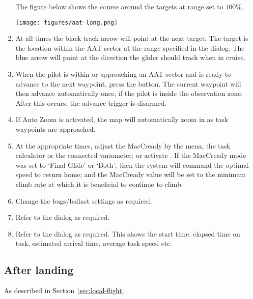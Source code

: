 \begin{enumerate}
The figure below shows the course around the targets at range set to $100$\%.
\begin{center}
\texttt{[image: figures/aat-long.png]}
\end{center}

\item  At all times the black track arrow will point at the next target.  The
target is the location within the AAT sector at the range specified in
the  dialog.  The blue arrow will point at the direction
the glider should track when in cruise.

\item  When the pilot is within or approaching an AAT sector and is ready to
advance to the next waypoint, press the  button.  The
current waypoint will then advance automatically once, if the pilot is
inside the observation zone.  After this occurs, the advance trigger
is disarmed.

\item If Auto Zoom is activated, the map will automatically zoom in as task waypoints are approached.

\item  At the appropriate times, adjust the MacCready by the menu,
the task calculator or the connected variometer; or activate .
If the MacCready mode was set to `Final Glide' or `Both', then the system will command the optimal
speed to return home; and the MacCready value will be set to the minimum climb
rate at which it is beneficial to continue to climb.

\item  Change the bugs/ballast settings as required.
\item  Refer to the  dialog as required.
\item  Refer to the  dialog as required.  This shows the start
time, elapsed time on task, estimated arrival time, average task speed etc.
\end{enumerate}

\subsection*{After landing}
As described in Section~\ref{sec:local-flight}.

